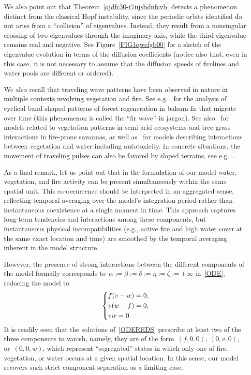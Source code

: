\documentclass[12pt]{amsart}
\numberwithin{equation}{section}
\begin{document}
We also point out that Theorem~\ref{ojdfc30-t7ujsbdnfcvb} detects a phenomenon distinct from the classical Hopf instability, since the periodic orbits identified do not arise from a ``collision'' of eigenvalues. Instead, they result from a nonsingular crossing of two eigenvalues through the imaginary axis, while the third eigenvalue remains real and negative.
See Figure~\ref{FIG1qwefgb00} for a sketch of the eigenvalue evolution in terms of the diffusion coefficients (notice also that, even in this case, it is not necessary to assume that the diffusion speeds of firelines and water pools are different or ordered).

We also recall that
traveling wave patterns have been observed in nature in multiple contexts involving vegetation and fire.
See e.g.~\cite{Sprugel1976}
for the analysis of
cyclical band-shaped patterns 
of forest regeneration in balsam fir 
that migrate over time (this phenomenon is
called the ``fir wave'' in jargon).
See also~\cite{GANIE21, BANA23}
for models related to 
vegetation patterns in semi-arid ecosystems and
tree-grass interactions in fire-prone savannas, as well as~\cite{CART8905t2} for 
models describing interactions between vegetation and water 
including autotoxicity.
In concrete situations, the movement of traveling pulses can also be favored by sloped terrains, see e.g.~\cite{CAR89u0g36}.

As a final remark, let us point out that in the formulation of our model water, vegetation, and fire activity can be present simultaneously within the same spatial unit. This co-occurrence should be interpreted in an aggregated sense, reflecting temporal averaging over the model’s integration period rather than instantaneous coexistence at a single moment in time. This approach captures long-term tendencies and interactions among these components, but instantaneous physical incompatibilities (e.g., active fire and high water cover at the same exact location and time) are smoothed by the temporal averaging inherent in the model structure.

However, the presence of strong interactions between the different components of the model
formally corresponds to~$\alpha:=\beta:=\delta:=\eta:=\zeta:=+\infty$ in~\eqref{ODE},
reducing the model to
\begin{equation}\label{ODEREDS}
\begin{dcases}
f( v- w)=0, \\
v( w- f)=0,\\
v w=0.
\end{dcases}
\end{equation}
It is readily seen that the solutions of~\eqref{ODEREDS} prescribe at least two of the three components to vanish, namely, they are of the form~$(f,0,0)$, $(0,v,0)$, or~$(0,0,w)$, which represent ``segregated'' states in which only one of fire, vegetation, or water occurs at a given spatial location. In this sense, our model recovers such strict component separation as a limiting case.
\end{document}
